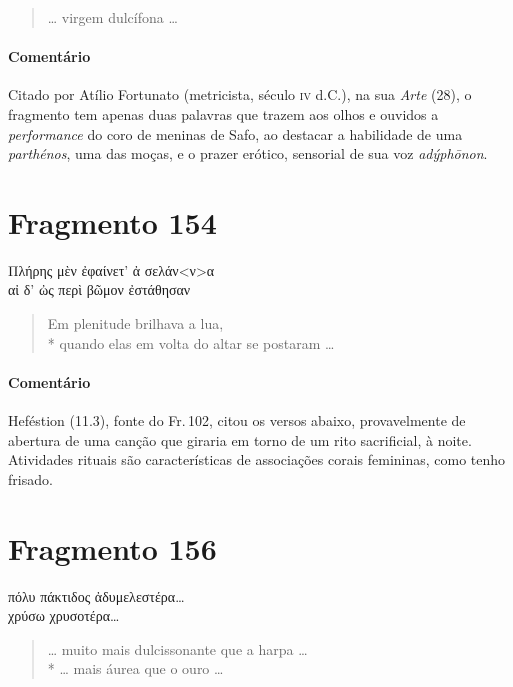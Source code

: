 \begin{verse}
\ldots{} virgem dulcífona \ldots{}
\end{verse}

\medskip

{\paragraph{Comentário} Citado por Atílio Fortunato (metricista, século \textsc{iv} d.C.), na sua \textit{Arte} (28), o fragmento tem apenas duas palavras que trazem aos olhos e ouvidos a \textit{performance} do coro de meninas de Safo, ao destacar a habilidade de uma \textit{parthénos}, uma das moças, e o prazer erótico, sensorial de sua voz \textit{adýphōnon}.}


\pagebreak
\section{Fragmento 154}

\begin{gkverse}
Πλήρης μὲν ἐφαίνετ’ ἀ σελάν<ν>α\\
αἰ δ’ ὠς περὶ βῶμον ἐστάθησαν
\end{gkverse}

\begin{verse}
Em plenitude brilhava a lua, \\*
quando elas em volta do altar se postaram \ldots{}
\end{verse}

\medskip

{\paragraph{Comentário} Heféstion (11.3), fonte do Fr.\,102, citou os versos abaixo, provavelmente de abertura
de uma canção que giraria em torno de um rito sacrificial, à noite. Atividades rituais são características de associações corais femininas, como tenho frisado.}


\section{Fragmento 156}

\begin{gkverse}
πόλυ πάκτιδος ἀδυμελεστέρα\ldots{}\\
χρύσω χρυσοτέρα\ldots{}
\end{gkverse}

\begin{verse}
\ldots{} muito mais dulcissonante que a harpa \ldots{}\\*
\ldots{} mais áurea que o ouro \ldots{}
\end{verse}

